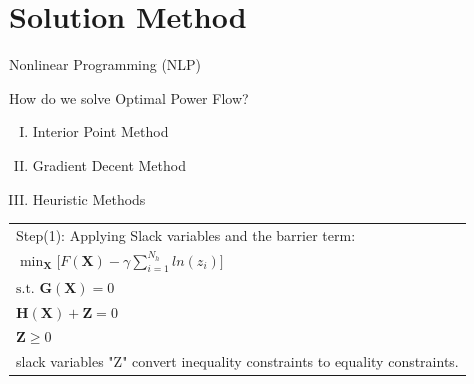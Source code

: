 \documentclass[aspectratio=169]{beamer}
\begin{document}
\section{Solution Method}
\begin{frame}{Nonlinear Programming (NLP)}
\begin{block}{How do we solve Optimal Power Flow?}
\begin{enumerate}[I.]
\item<1-> Interior Point Method
\item<2-> Gradient Decent Method
\item<3-> Heuristic Methods 
\end{enumerate}
\end{block}
\end{frame}

\begin{frame}

\begin{center}
\begin{tabular}{|l|} 
\hline
\rowcolor{yellow}
Step(1): Applying Slack variables and the barrier term: \\
\rowcolor{Gray}

$\min_{\mathbf{X}} \bigg[F(\mathbf{X})-\gamma\sum_{i=1}^{N_h}{ln(z_{i})}\bigg]$\\ \rowcolor{Gray}

 $\textrm{s.t. }  \mathbf{G}(\mathbf{X})=0$\\ \rowcolor{Gray}

$\mathbf{H}(\mathbf{X})+\mathbf{Z}=0$\\ \rowcolor{Gray}

 $\mathbf{Z}\geq 0$\\
\hline
slack variables "Z" convert inequality constraints to equality constraints.\\
\hline
\end{tabular}
\end{center}

\end{frame}

\end{document}
